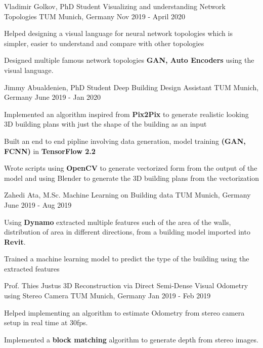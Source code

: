 \begin{cventries}
	\cventry
	{Vladimir Golkov, PhD Student} %
	{Visualizing and understanding Network Topologies} %
	{TUM Munich, Germany} %
	{Nov 2019 - April 2020} %
	{
		\begin{cvitems} %
			\item {Helped designing a visual language for neural network topologies which is simpler, easier to understand and compare with other topologies}
			\item {Designed multiple famous network topologies \textbf{GAN,
			Auto Encoders} using the visual language.}
		\end{cvitems}
	}
	\cventry
	{Jimmy Abualdenien, PhD Student} %
	{Deep Building Design Assistant} %
	{TUM Munich, Germany} %
	{June 2019 - Jan 2020} %
	{
		\begin{cvitems} %
			\item {Implemented an algorithm inspired from \textbf{Pix2Pix} to generate realistic looking 3D building plans with just the shape of the building as an input}
			\item {Built an end to end pipline involving data generation, model training \textbf{(GAN, FCNN)} in \textbf{TensorFlow 2.2}}
			\item {Wrote scripts using \textbf{OpenCV} to generate vectorized form from the output of the model and using Blender to generate the 3D building plans from the vectorization}
		\end{cvitems}
	}
	\cventry
	{Zahedi Ata, M.Sc.} %
	{Machine Learning on Building data} %
	{TUM Munich, Germany} %
	{June 2019 - Aug 2019} %
	{
		\begin{cvitems} %
			\item {Using \textbf{Dynamo} extracted multiple features such of the area of the walls, distribution of area in different directions, from a building model imported into \textbf{Revit}.} 
			\item {Trained a machine learning model to predict the type of the building using the extracted features}
		\end{cvitems}
	}

  	\cventry
    {Prof. Thies Justus} %
    {3D Reconstruction via Direct Semi-Dense Visual Odometry using Stereo Camera} %
    {TUM Munich, Germany} %
    {Jan 2019 - Feb 2019} %
    {
      \begin{cvitems} %
      	\item {Helped implementing an algorithm to estimate Odometry from stereo camera setup in real time at 30fps.}
		\item {Implemented a \textbf{block matching} algorithm to generate depth from stereo images.}
      \end{cvitems}
	}
	

\end{cventries}

